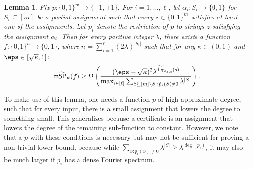 \documentclass[11pt]{article}
\numberwithin{equation}{section}
\newtheorem{lemma}[theorem]{Lemma}
\theoremstyle{definition}
\theoremstyle{plain}
\begin{document}
\begin{lemma}\label{lem:better-version}
Fix $p:\{0,1\}^m\rightarrow\{-1,+1\}$. For $i=1,\dots,\ell$, let $\alpha_i:S_i\rightarrow\{0,1\}$ for $S_i\subseteq[m]$ be a partial assignment such that every $z\in\{0,1\}^m$ satisfies at least one of the assignments.
Let $p_i$ denote the restriction of $p$ to strings $z$ satisfying the assignment $\alpha_i$. Then for every positive integer $\lambda$, there exists a function $f:\{0,1\}^n\rightarrow\{0,1\}$, where $n=\sum_{i=1}^{\ell}(2\lambda)^{|S_i|}$ such that for any $\kappa\in (0,1)$ and $\eps\in[\sqrt{\kappa},1]$:
\begin{align*}
\mathsf{m}\widetilde{\mathsf{SP}}_\kappa(f)\geq \Omega\left(\frac{(\eps-\sqrt{\kappa})^2\lambda^{\widetilde{\deg}_{\eps}(p)}}{\max_{i\in [\ell]}\sum_{S\subseteq[m]\setminus S_i:\hat{p}_i(S)\neq 0}\lambda^{|S|}}\right).
\end{align*}
\end{lemma}
To make use of this lemma, one needs a function $p$ of high approximate degree, such that for every input, there is a small assignment that lowers the degree to something small. This generalizes  because a certificate is an assignment that lowers the degree of the remaining sub-function to constant. However, we note that a $p$ with these conditions is necessary but may not be sufficient for proving a non-trivial lower bound, because while $\sum_{S:\hat{p}_i(S)\neq 0}\lambda^{|S|}\geq \lambda^{\deg(p_i)}$, it may also be much larger if $p_i$ has a dense Fourier spectrum. 
\end{document}
